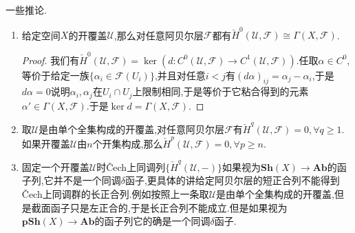 一些推论.
\begin{enumerate}
	\item 给定空间$X$的开覆盖$\mathscr{U}$,那么对任意阿贝尔层$\mathscr{F}$都有$\check{H}^0(\mathscr{U},\mathscr{F})\cong\Gamma(X,\mathscr{F})$.
	\begin{proof}
		
		我们有$\check{H}^0(\mathscr{U},\mathscr{F})=\ker(d:C^0(\mathscr{U},\mathscr{F})\to C^1(\mathscr{U},\mathscr{F}))$.任取$\alpha\in C^0$,等价于给定一族$\{\alpha_i\in\mathscr{F}(U_i)\}$,并且对任意$i<j$有$(d\alpha)_{ij}=
		\alpha_j-\alpha_i$,于是$d\alpha=0$说明$\alpha_i,\alpha_j$在$U_i\cap U_j$上限制相同,于是等价于它粘合得到的元素$\alpha'\in\Gamma(X,\mathscr{F})$.于是$\ker d=\Gamma(X,\mathscr{F})$.
	\end{proof}
	\item 取$\mathscr{U}$是由单个全集构成的开覆盖,对任意阿贝尔层$\mathscr{F}$有$\check{H}^q(\mathscr{U},\mathscr{F})=0,\forall q\ge1$.如果开覆盖$\mathscr{U}$由$n$个开集构成,那么$\check{H}^p(\mathscr{U},\mathscr{F})=0,\forall p\ge n$.
	\item 固定一个开覆盖$\mathscr{U}$时\v{C}ech上同调列$\{\check{H}^q(\mathscr{U},-)\}$如果视为$\textbf{Sh}(X)\to\textbf{Ab}$的函子列,它并不是一个同调$\delta$函子,更具体的讲给定阿贝尔层的短正合列不能得到\v{C}ech上同调群的长正合列.例如按照上一条取$\mathscr{U}$是由单个全集构成的开覆盖,但是截面函子只是左正合的,于是长正合列不能成立.但是如果视为$\textbf{pSh}(X)\to\textbf{Ab}$的函子列它的确是一个同调$\delta$函子.
\end{enumerate}

